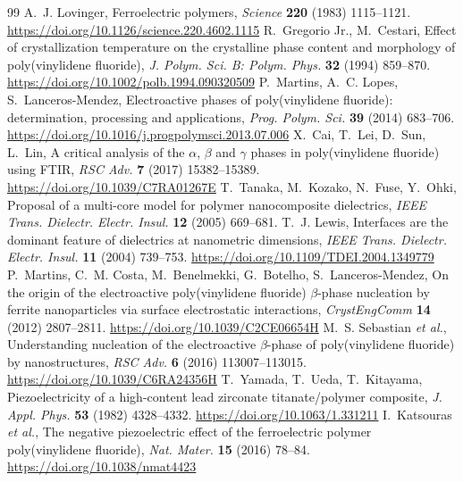 \documentclass[11pt,a4paper]{article}
\begin{document}

\begin{thebibliography}{99}
\small
{} A.~J. Lovinger, Ferroelectric polymers, \emph{Science} \textbf{220} (1983) 1115--1121. \url{https://doi.org/10.1126/science.220.4602.1115}
 R.~Gregorio Jr., M.~Cestari, Effect of crystallization temperature on the crystalline phase content and morphology of poly(vinylidene fluoride), \emph{J. Polym. Sci. B: Polym. Phys.} \textbf{32} (1994) 859--870. \url{https://doi.org/10.1002/polb.1994.090320509}
 P.~Martins, A.~C. Lopes, S.~Lanceros-Mendez, Electroactive phases of poly(vinylidene fluoride): determination, processing and applications, \emph{Prog. Polym. Sci.} \textbf{39} (2014) 683--706. \url{https://doi.org/10.1016/j.progpolymsci.2013.07.006}
 X.~Cai, T.~Lei, D.~Sun, L.~Lin, A critical analysis of the $\alpha$, $\beta$ and $\gamma$ phases in poly(vinylidene fluoride) using FTIR, \emph{RSC Adv.} \textbf{7} (2017) 15382--15389. \url{https://doi.org/10.1039/C7RA01267E}
 T.~Tanaka, M.~Kozako, N.~Fuse, Y.~Ohki, Proposal of a multi-core model for polymer nanocomposite dielectrics, \emph{IEEE Trans. Dielectr. Electr. Insul.} \textbf{12} (2005) 669--681.
 T.~J. Lewis, Interfaces are the dominant feature of dielectrics at nanometric dimensions, \emph{IEEE Trans. Dielectr. Electr. Insul.} \textbf{11} (2004) 739--753. \url{https://doi.org/10.1109/TDEI.2004.1349779}
 P.~Martins, C.~M. Costa, M.~Benelmekki, G.~Botelho, S.~Lanceros-Mendez, On the origin of the electroactive poly(vinylidene fluoride) $\beta$-phase nucleation by ferrite nanoparticles via surface electrostatic interactions, \emph{CrystEngComm} \textbf{14} (2012) 2807--2811. \url{https://doi.org/10.1039/C2CE06654H}
 M.~S. Sebastian \emph{et al.}, Understanding nucleation of the electroactive $\beta$-phase of poly(vinylidene fluoride) by nanostructures, \emph{RSC Adv.} \textbf{6} (2016) 113007--113015. \url{https://doi.org/10.1039/C6RA24356H}
 T.~Yamada, T.~Ueda, T.~Kitayama, Piezoelectricity of a high-content lead zirconate titanate/polymer composite, \emph{J. Appl. Phys.} \textbf{53} (1982) 4328--4332. \url{https://doi.org/10.1063/1.331211}
 I.~Katsouras \emph{et al.}, The negative piezoelectric effect of the ferroelectric polymer poly(vinylidene fluoride), \emph{Nat. Mater.} \textbf{15} (2016) 78--84. \url{https://doi.org/10.1038/nmat4423}

\end{thebibliography}
\end{document}
